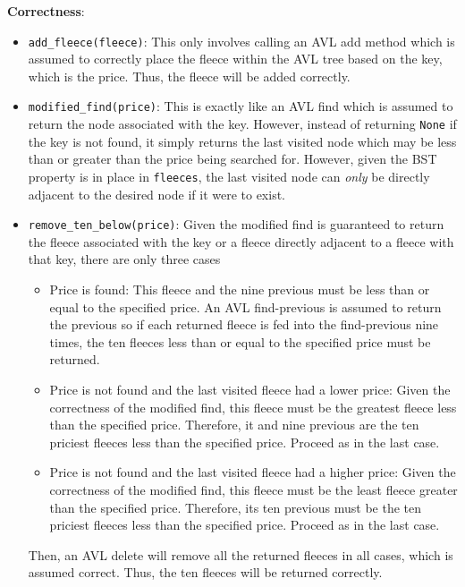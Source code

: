 \documentclass[12pt,twoside]{article}
\begin{document}
\begin{problems}
\begin{problemparts}
    {\bf Correctness}: \begin{itemize}
        \item {\tt add\_fleece(fleece)}: This only involves calling an AVL
        add method which is assumed to correctly place the fleece within the
        AVL tree based on the key, which is the price. Thus, the fleece will
        be added correctly.
        \item {\tt modified\_find(price)}: This is exactly like an AVL find
        which is assumed to return the node associated with the key. However,
        instead of returning {\tt None} if the key is not found, it simply
        returns the last visited node which may be less than or greater than
        the price being searched for. However, given the BST property is in
        place in {\tt fleeces}, the last visited node can {\it only} be
        directly adjacent to the desired node if it were to exist.
        \item {\tt remove\_ten\_below(price)}: Given the modified find is
        guaranteed to return the fleece associated with the key or a fleece
        directly adjacent to a fleece with that key, there are only three cases
        \begin{itemize}
            \item Price is found: This fleece and the nine previous must be
            less than or equal to the specified price. An AVL find-previous
            is assumed to return the previous so if each returned fleece is
            fed into the find-previous nine times, the ten fleeces less than
            or equal to the specified price must be returned. 
            \item Price is not found and the last visited fleece had a lower
            price: Given the correctness of the modified find, this fleece
            must be the greatest fleece less than the specified price.
            Therefore, it and nine previous are the ten priciest fleeces less
            than the specified price. Proceed as in the last case.
            \item Price is not found and the last visited fleece had a higher
            price: Given the correctness of the modified find, this fleece
            must be the least fleece greater than the specified price.
            Therefore, its ten previous must be the ten priciest fleeces less
            than the specified price. Proceed as in the last case.
        \end{itemize}
        Then, an AVL delete will remove all the returned fleeces in all
        cases, which is assumed correct. Thus, the ten fleeces will be
        returned correctly.
    \end{itemize}


\end{problemparts}
\end{problems}
\end{document}
